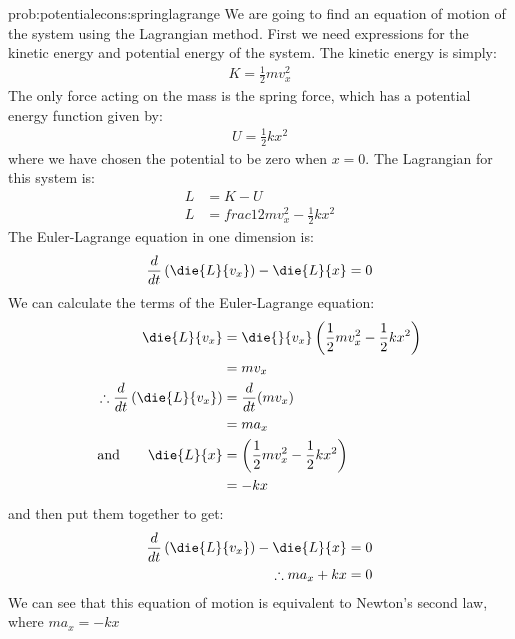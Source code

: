 \begin{solution}{prob:potentialecons:springlagrange}\label{soln:potentialecons:springlagrange} We are going to find an equation of motion of the system using the Lagrangian method. First we need expressions for the kinetic energy and potential energy of the system. The kinetic energy is simply:
\begin{align*}
K=\frac{1}{2}mv_x^2
\end{align*}
The only force acting on the mass is the spring force, which has a potential energy function given by:
\begin{align*} 
U=\frac{1}{2}kx^2
\end{align*}
where we have chosen the potential to be zero when $x=0$. The Lagrangian for this system is:
\begin{align*}
L&=K-U\\
L&=frac{1}{2}mv_x^2-\frac{1}{2}kx^2
\end{align*}
The Euler-Lagrange equation in one dimension is:
\begin{align*}
\frac{d}{dt}\left(\die{L}{v_x}\right)-\die{L}{x} = 0
\end{align*}
We can calculate the terms of the Euler-Lagrange equation:
\begin{align*}
\die{L}{v_x}&=\die{}{v_x}\left(\frac{1}{2}mv_x^2-\frac{1}{2}kx^2\right)\\
&=mv_x\\
\therefore \frac{d}{dt}\left(\die{L}{v_x}\right)&=\frac{d}{dt}(mv_x)\\
&=ma_x\\
\textrm{and}\qquad \die{L}{x}&=\left(\frac{1}{2}mv_x^2-\frac{1}{2}kx^2\right)\\
&=-kx
\end{align*}
and then put them together to get:
\begin{align*}
\frac{d}{dt}\left(\die{L}{v_x}\right)-\die{L}{x} &= 0\\
\therefore ma_x+kx&=0\\
\end{align*}
We can see that this equation of motion is equivalent to Newton's second law, where $ma_x=-kx$
\end{solution}

